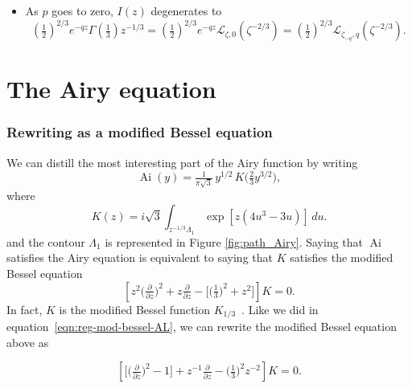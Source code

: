\documentclass{article}
\theoremstyle{definition}
\DeclareMathOperator{\Ai}{Ai}
\newcommand{\laplace}{\mathcal{L}}
\begin{document}
\color{DarkTurquoise}
\begin{itemize}
\item As $p$ goes to zero, $I(z)$ degenerates to
\[ \left(\tfrac{1}{2}\right)^{2/3} e^{-qz} \Gamma(\tfrac{1}{3}) z^{-1/3} = \left(\tfrac{1}{2}\right)^{2/3} e^{-qz} \laplace_{\zeta,0}(\zeta^{-2/3}) = \left(\tfrac{1}{2}\right)^{2/3} \laplace_{\zeta_{-q},q}(\zeta^{-2/3}). \]
\end{itemize}

\color{black}

\appendix

\section{The Airy equation}\label{airy-appendix}

\subsubsection{Rewriting as a modified Bessel equation}
We can distill the most interesting part of the Airy function by writing
\[ \Ai(y) = \tfrac{1}{\pi\sqrt{3}}\,y^{1/2}\,K\big(\tfrac{2}{3} y^{3/2}\big), \]
where
\begin{equation}\label{integral:mod-bessel}
K(z) = i\sqrt{3} \int_{z^{-1/3}\Lambda_1} \exp\left[z \left(4u^3 - 3u\right)\right]\,du.
\end{equation}
and the contour $\Lambda_1$ is represented in Figure \ref{fig:path_Airy}.
Saying that $\Ai$ satisfies the Airy equation is equivalent to saying that $K$ satisfies the modified Bessel equation
\begin{equation}\label{eqn:mod-bessel-1/3}
\left[z^2 \big(\tfrac{\partial}{\partial z}\big)^2 + z \tfrac{\partial}{\partial z} - \big[\big(\tfrac{1}{3}\big)^2 + z^2\big]\right] K = 0.
\end{equation}
In fact, $K$ is the modified Bessel function $K_{1/3}$~\cite[equation~9.6.1]{dlmf}.
Like we did in equation~\eqref{eqn:reg-mod-bessel-AL}, we can rewrite the modified Bessel equation above as 

\begin{equation}\label{eqn:reg-mod-bessel}
\left[ \big[ \big(\tfrac{\partial}{\partial z}\big)^2 - 1 \big] + z^{-1} \tfrac{\partial}{\partial z} - \big(\tfrac{1}{3}\big)^2 z^{-2} \right] K = 0.
\end{equation}
\end{document}
